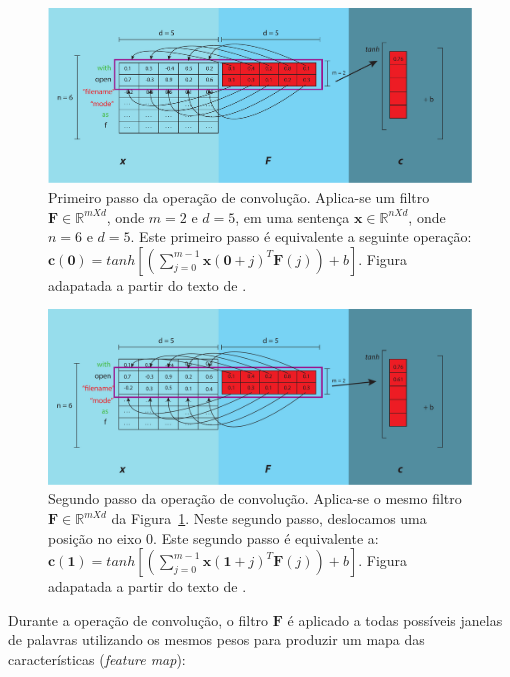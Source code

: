 \begin{figure}[h]
    \centering
    \includegraphics[width=1\textwidth]{figuras/cap-problema/first-step-convolution.pdf}
    \caption{Primeiro passo da operação de convolução. Aplica-se um filtro $\bm{F} \in \mathbb{R}^{m X d}$, onde $m = 2$ e $d = 5$, em uma sentença $\bm{x} \in \mathbb{R}^{n X d}$, onde $n = 6$ e $d = 5$. Este primeiro passo é equivalente a seguinte operação: $\bm{c}(\bm{0}) = tanh \left[\left(\sum_{j=0}^{m - 1} \bm{x}(\bm{0} + j)^{T}\bm{F}(j)\right) + b\right]$. Figura adapatada a partir do texto de \cite{joshua-kim-cnn-understanding-word-embeddings-2019}.} 
    \label{fig:first-step-convolutional}
\end{figure}

\begin{figure}[h]
    \centering
    \includegraphics[width=1\textwidth]{figuras/cap-problema/second-step-convolution.pdf}
    \caption{Segundo passo da operação de convolução. Aplica-se o mesmo filtro $\bm{F} \in \mathbb{R}^{m X d}$ da Figura~\ref{fig:first-step-convolutional}. Neste segundo passo, deslocamos uma posição no eixo $0$. Este segundo passo é equivalente a: $\bm{c}(\bm{1}) = tanh [(\sum_{j=0}^{m - 1} \bm{x}(\bm{1} + j)^{T}\bm{F}(j)) + b]$. Figura adapatada a partir do texto de \cite{joshua-kim-cnn-understanding-word-embeddings-2019}.}
    \label{fig:second-step-convolutional}
\end{figure}


Durante a operação de convolução, o filtro $\bm{F}$ é aplicado a todas possíveis janelas de palavras utilizando os mesmos pesos para produzir um mapa das características (\textit{feature map}):


